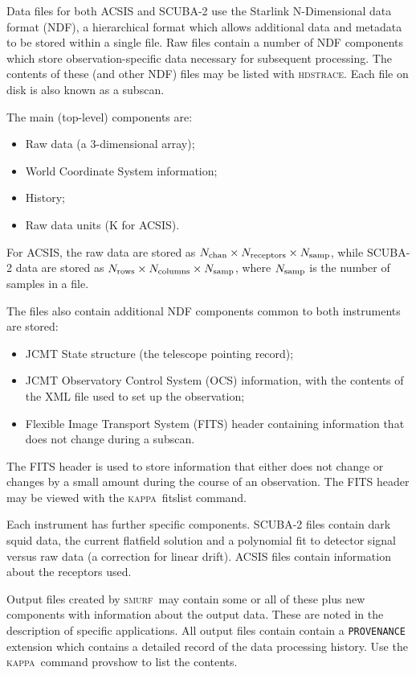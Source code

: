 \documentclass[twoside,11pt]{article}
\newcommand{\xref}[3]{#1}
\renewcommand{\_}{\texttt{\symbol{95}}}
\newcommand{\HDSTRACE}{\textsc{hdstrace}}
\newcommand{\HDSTRACEref}{\xref{\HDSTRACE}{sun102}{}}
\newcommand{\KAPPA}{\textsc{kappa}}
\newcommand{\SMURF}{\textsc{smurf}}
\newcommand{\ndf}{\xref{NDF}{sun33}{}}
\newcommand{\ndfcomp}[1]{\texttt{#1}}
\begin{document}
Data files for both ACSIS and SCUBA-2 use the Starlink N-Dimensional
data format (\ndf), a hierarchical format which allows
additional data and metadata to be stored within a single file. Raw
files contain a number of NDF components which store
observation-specific data necessary for subsequent processing. The
contents of these (and other NDF) files may be listed with
\HDSTRACEref. Each file on disk is also known as a subscan.

The main (top-level) components are:
\begin{itemize}
\item Raw data (a 3-dimensional array);
\item World Coordinate System information;
\item History;
\item Raw data units (K for ACSIS).
\end{itemize}
For ACSIS, the raw data are stored as $N_{\rm chan} \times N_{\rm
  receptors} \times N_{\rm samp}$, while SCUBA-2 data are stored as
$N_{\rm rows} \times N_{\rm columns} \times N_{\rm samp}$, where
$N_{\rm samp}$ is the number of samples in a file.

The files also contain additional NDF components common to both
instruments are stored:
\begin{itemize}
\item JCMT State structure (the telescope pointing record);
\item JCMT Observatory Control System (OCS) information, with the
  contents of the XML file used to set up the observation;
\item Flexible Image Transport System (FITS) header containing
  information that does not change during a subscan.
\end{itemize}
The FITS header is used to store information that either does not
change or changes by a small amount during the course of an
observation. The FITS header may be viewed with the \KAPPA\ fitslist
command.

Each instrument has further specific components. SCUBA-2 files contain
dark squid data, the current flatfield solution and a polynomial fit
to detector signal versus raw data (a correction for linear drift).
ACSIS files contain information about the receptors used.

Output files created by \SMURF\ may contain some or all of these plus
new components with information about the output data. These are noted
in the description of specific applications. All output files contain
contain a \ndfcomp{PROVENANCE} extension which contains a detailed
record of the data processing history. Use the \KAPPA\ command
provshow to list the contents.
\end{document}
